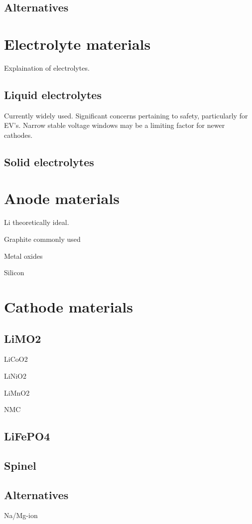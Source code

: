 \subsection{Alternatives}

\section{Electrolyte materials}
Explaination of electrolytes.
\subsection{Liquid electrolytes}
Currently widely used.
Significant concerns pertaining to safety, particularly for EV's.
Narrow stable voltage windows may be a limiting factor for newer cathodes.
\subsection{Solid electrolytes}
\citet{Bachman2016,Manthiram2017a,Janek2016,Famprikis2019,Zhang2018}
\section{Anode materials}
Li theoretically ideal.

Graphite commonly used

Metal oxides

Silicon

\section{Cathode materials}
\subsection{LiMO2}
LiCoO2

LiNiO2

LiMnO2

NMC

\subsection{LiFePO4}

\subsection{Spinel}

\subsection{Alternatives}
Na/Mg-ion

